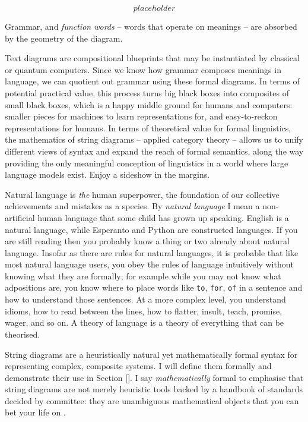 \begin{marginfigure}
\centering
\[placeholder\]
\caption{Grammar, and \emph{function words} -- words that operate on meanings -- are absorbed by the geometry of the diagram.}
\end{marginfigure}


Text diagrams are compositional blueprints that may be instantiated by classical or quantum computers. Since we know how grammar composes meanings in language, we can quotient out grammar using these formal diagrams. In terms of potential practical value, this process turns big black boxes into composites of small black boxes, which is a happy middle ground for humans and computers: smaller pieces for machines to learn representations for, and easy-to-reckon representations for humans. In terms of theoretical value for formal linguistics, the mathematics of string diagrams -- applied category theory -- allows us to unify different views of syntax and expand the reach of formal semantics, along the way providing the only meaningful conception of linguistics in a world where large language models exist. Enjoy a sideshow in the margins.


Natural language is \emph{the} human superpower, the foundation of our collective achievements and mistakes as a species. By \emph{natural language} I mean a non-artificial human language that some child has grown up speaking. English is a natural language, while Esperanto and Python are constructed languages. If you are still reading then you probably know a thing or two already about natural language. Insofar as there are rules for natural languages, it is probable that like most natural language users, you obey the rules of language intuitively without knowing what they are formally; for example while you may not know what adpositions are, you know where to place words like \texttt{to}, \texttt{for}, \texttt{of} in a sentence and how to understand those sentences. At a more complex level, you understand idioms, how to read between the lines, how to flatter, insult, teach, promise, wager, and so on. A theory of language is a theory of everything that can be theorised.


String diagrams are a heuristically natural yet mathematically formal syntax for representing complex, composite systems. I will define them formally and demonstrate their use in Section \ref{}. I say \emph{mathematically} formal to emphasise that string diagrams are not merely heuristic tools backed by a handbook of standards decided by committee: they are unambiguous mathematical objects that you can bet your life on \citep{joyal_geometry_1991,joyal_geometry_nodate,maclane_natural_1963,lane_categories_2010,selinger_survey_2010}.\\

